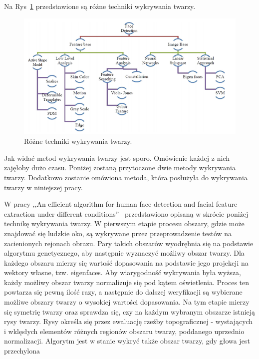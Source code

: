 \documentclass[a4paper,twoside,12pt]{book}
\begin{document}
    Na Rys~\ref{fig.technikiWykrywaniaTwarzy} przedstawione są różne techniki wykrywania twarzy.
    \begin{figure}
        \centering
        \includegraphics[width=15cm]{Obrazy/technikiWykrywaniaTwarzy.jpg}
        \caption{Różne techniki wykrywania twarzy.~\cite{faceDetectionTechniques}}
        \label{fig.technikiWykrywaniaTwarzy}
    \end{figure}


    Jak widać metod wykrywania twarzy jest sporo.
    Omówienie każdej z nich zajęłoby dużo czasu.
    Poniżej zostaną przytoczone dwie metody wykrywania twarzy.
    Dodatkowo zostanie omówiona metoda, która posłużyła do wykrywania twarzy w niniejszej pracy.

    W pracy ,,An efficient algorithm for human face detection and facial
    feature extraction under different conditions''~\cite{wongLamSiu}
    przedstawiono opisaną w skrócie poniżej technikę wykrywania twarzy.
    W pierwszym etapie procesu obszary, gdzie może znajdować się ludzkie oko,
    są wykrywane przez przeprowadzenie testów na zacienionych rejonach obrazu.
    Pary takich obszarów wyodrębnia się na podstawie algorytmu genetycznego,
    aby następnie wyznaczyć możliwy obszar twarzy.
    Dla każdego obszaru mierzy się wartość dopasowania na podstawie jego projekcji na wektory własne,
    tzw. eigenfaces.
    Aby wiarygodność wykrywania była wyższa,
    każdy możliwy obszar twarzy normalizuje się pod kątem oświetlenia.
    Proces ten powtarza się pewną ilość razy,
    a następnie do dalszej weryfikacji są wybierane możliwe obszary twarzy o wysokiej wartości dopasowania.
    Na tym etapie mierzy się symetrię twarzy oraz sprawdza się,
    czy na każdym wybranym obszarze istnieją rysy twarzy.
    Rysy określa się przez ewaluację rzeźby topograficznej - wystających i wklęsłych elementów
    różnych regionów obszaru twarzy, poddanego uprzednio normalizacji.
    Algorytm jest w stanie wykryć także obszar twarzy, gdy głowa jest przechylona
\end{document}
